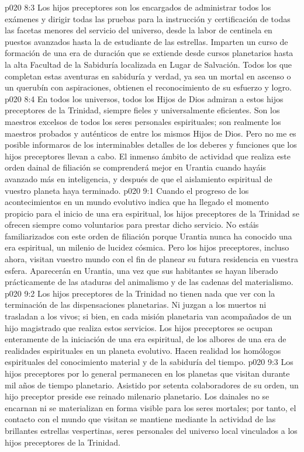 \vs p020 8:3 Los hijos preceptores son los encargados de administrar todos los exámenes y dirigir todas las pruebas para la instrucción y certificación de todas las facetas menores del servicio del universo, desde la labor de centinela en puestos avanzados hasta la de estudiante de las estrellas. Imparten un curso de formación de una era de duración que se extiende desde cursos planetarios hasta la alta Facultad de la Sabiduría localizada en Lugar de Salvación. Todos los que completan estas aventuras en sabiduría y verdad, ya sea un mortal en ascenso o un querubín con aspiraciones, obtienen el reconocimiento de su esfuerzo y logro.
\vs p020 8:4 En todos los universos, todos los Hijos de Dios admiran a estos hijos preceptores de la Trinidad, siempre fieles y universalmente eficientes. Son los maestros excelsos de todos los seres personales espirituales; son realmente los maestros probados y auténticos de entre los mismos Hijos de Dios. Pero no me es posible informaros de los interminables detalles de los deberes y funciones que los hijos preceptores llevan a cabo. El inmenso ámbito de actividad que realiza este orden dainal de filiación se comprenderá mejor en Urantia cuando hayáis avanzado más en inteligencia, y después de que el aislamiento espiritual de vuestro planeta haya terminado.
\vs p020 9:1 Cuando el progreso de los acontecimientos en un mundo evolutivo indica que ha llegado el momento propicio para el inicio de una era espiritual, los hijos preceptores de la Trinidad se ofrecen siempre como voluntarios para prestar dicho servicio. No estáis familiarizados con este orden de filiación porque Urantia nunca ha conocido una era espiritual, un milenio de lucidez cósmica. Pero los hijos preceptores, incluso ahora, visitan vuestro mundo con el fin de planear su futura residencia en vuestra esfera. Aparecerán en Urantia, una vez que sus habitantes se hayan liberado prácticamente de las ataduras del animalismo y de las cadenas del materialismo.
\vs p020 9:2 Los hijos preceptores de la Trinidad no tienen nada que ver con la terminación de las dispensaciones planetarias. Ni juzgan a los muertos ni trasladan a los vivos; si bien, en cada misión planetaria van acompañados de un hijo magistrado que realiza estos servicios. Los hijos preceptores se ocupan enteramente de la iniciación de una era espiritual, de los albores de una era de realidades espirituales en un planeta evolutivo. Hacen realidad los homólogos espirituales del conocimiento material y de la sabiduría del tiempo.
\vs p020 9:3 Los hijos preceptores por lo general permanecen en los planetas que visitan durante mil años de tiempo planetario. Asistido por setenta colaboradores de su orden, un hijo preceptor preside ese reinado milenario planetario. Los dainales no se encarnan ni se materializan en forma visible para los seres mortales; por tanto, el contacto con el mundo que visitan se mantiene mediante la actividad de las brillantes estrellas vespertinas, seres personales del universo local vinculados a los hijos preceptores de la Trinidad.
